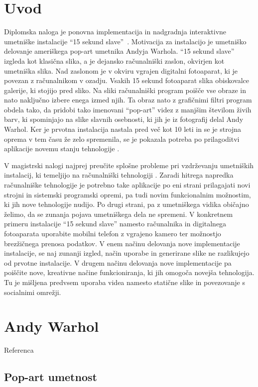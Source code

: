 \chapter{Uvod}
Diplomska naloga je ponovna implementacija in nadgradnja interaktivne
umetniške instalacije ``15 sekund slave''~\cite{15secLeonardo}. Motivacija za
instalacijo je umetniško delovanje ameriškega pop-art umetnika Andyja Warhola.
``15 sekund slave'' izgleda kot klasična slika, a je dejansko računalniški
zaslon, okvirjen kot umetniška slika. Nad zaslonom je v okviru vgrajen
digitalni fotoaparat, ki je povezan z računalnikom v ozadju. Vsakih 15 sekund
fotoaparat slika obiskovalce galerije, ki stojijo pred sliko. Na sliki
računalniški program poišče vse obraze in nato naključno izbere enega izmed
njih. Ta obraz nato z grafičnimi filtri program obdela tako, da pridobi tako
imenovani ``pop-art'' videz z manjšim številom živih barv, ki spominjajo na
slike slavnih osebnosti, ki jih je iz fotografij delal Andy Warhol. Ker je
prvotna instalacija nastala pred več kot 10 leti in se je strojna oprema v tem
času že zelo spremenila, se je pokazala potreba po prilagoditvi aplikacije
novemu stanju tehnologije \cite{trifonova}.

V magistrski nalogi najprej preučite splošne probleme pri vzdrževanju
umetniških instalacij, ki temeljijo na računalniški tehnologiji
\cite{miller1,miller2,digitalartconservation}. Zaradi hitrega napredka
računalniške tehnologije je potrebno take aplikacije po eni strani prilagajati
novi strojni in sistemski programski opremi, pa tudi novim funkcionalnim
možnostim, ki jih nove tehnologije nudijo. Po drugi strani, pa z umetniškega
vidika običajno želimo, da se zunanja pojava umetniškega dela ne spremeni. V
konkretnem primeru instalacije ``15 sekund slave'' namesto računalnika in
digitalnega fotoaparata uporabite mobilni telefon z vgrajeno kamero ter
možnostjo brezžičnega prenosa podatkov. V enem načinu delovanja nove
implementacije instalacije, se naj zunanji izgled, način uporabe in generirane
slike ne razlikujejo od prvotne instalacije. V drugem načinu delovanja nove
implementacije pa poiščite nove, kreativne načine funkcioniranja, ki jih
omogoča novejša tehnologija. Tu je mišljena predvsem uporaba videa namesto
statične slike in povezovanje s socialnimi omrežji.

\chapter{Andy Warhol}
Referenca~\cite{wiki:AndyWarhol}
\section{Pop-art umetnost}

